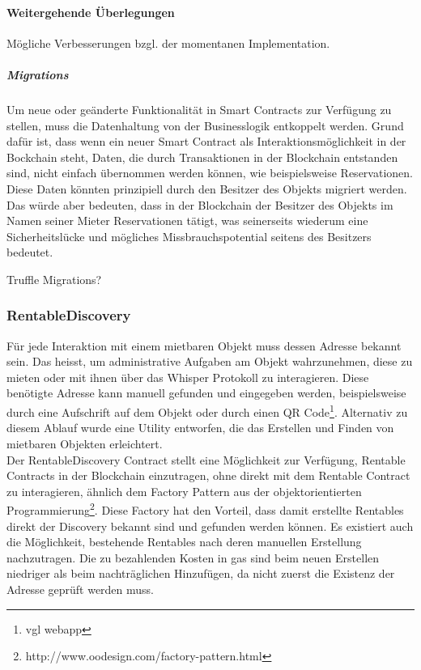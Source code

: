 \paragraph{Weitergehende Überlegungen}
Mögliche Verbesserungen bzgl. der momentanen Implementation.

\subparagraph{Migrations}
Um neue oder geänderte Funktionalität in Smart Contracts zur Verfügung zu stellen, muss die Datenhaltung von der Businesslogik entkoppelt werden. Grund dafür ist, dass wenn ein neuer Smart Contract als Interaktionsmöglichkeit in der Bockchain steht, Daten, die durch Transaktionen in der Blockchain entstanden sind, nicht einfach übernommen werden können, wie beispielsweise Reservationen. Diese Daten könnten prinzipiell durch den Besitzer des Objekts migriert werden. Das würde aber bedeuten, dass in der Blockchain der Besitzer des Objekts im Namen seiner Mieter Reservationen tätigt, was seinerseits wiederum eine Sicherheitslücke und mögliches Missbrauchspotential seitens des Besitzers bedeutet.

Truffle Migrations?


\subsubsection{RentableDiscovery}
Für jede Interaktion mit einem mietbaren Objekt muss dessen Adresse bekannt sein. Das heisst, um administrative Aufgaben am Objekt wahrzunehmen, diese zu mieten oder mit ihnen über das Whisper Protokoll zu interagieren. Diese benötigte Adresse kann manuell gefunden und eingegeben werden, beispielsweise durch eine Aufschrift auf dem Objekt oder durch einen QR Code\footnote{vgl webapp}. Alternativ zu diesem Ablauf wurde eine Utility entworfen, die das Erstellen und Finden von mietbaren Objekten erleichtert.
\\Der RentableDiscovery Contract stellt eine Möglichkeit zur Verfügung, Rentable Contracts in der Blockchain einzutragen, ohne direkt mit dem Rentable Contract zu interagieren, ähnlich dem Factory Pattern aus der objektorientierten Programmierung\footnote{http://www.oodesign.com/factory-pattern.html}. Diese Factory hat den Vorteil, dass damit erstellte Rentables direkt der Discovery bekannt sind und gefunden werden können. Es existiert auch die Möglichkeit, bestehende Rentables nach deren manuellen Erstellung nachzutragen. Die zu bezahlenden Kosten in gas sind beim neuen Erstellen niedriger als beim nachträglichen Hinzufügen, da nicht zuerst die Existenz der Adresse geprüft werden muss.

